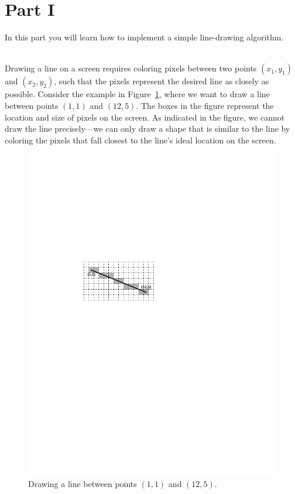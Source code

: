 \documentclass[epsfig,10pt,fullpage]{article}
\begin{document}
\section*{Part I}
In this part you will learn how to implement a simple line-drawing algorithm.

~\\
Drawing a line on a screen requires coloring pixels between two points $(x_1,y_1)$ and 
$(x_2,y_2)$, such that the pixels represent the desired line as closely as possible. Consider 
the example in Figure~\ref{fig:line_drawing}, where we want to draw a line between 
points $(1,1)$ and $(12,5)$. The boxes in the figure represent the location and size of pixels
on the screen. As indicated in the figure, we cannot draw the line precisely---we can
only draw a shape that is similar to the line by coloring the pixels that fall closest to 
the line's ideal location on the screen.

\begin{figure}[h!]
   \begin{center}
       \includegraphics{figures/fig_line_drawing}
   \end{center}
   \caption{Drawing a line between points $(1,1)$ and $(12,5)$.}
	\label{fig:line_drawing}
\end{figure}
\end{document}
